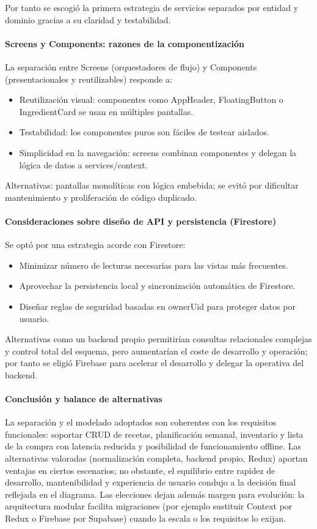 \documentclass[twoside, openright, 11pt]{report}
\begin{document}
		Por tanto se escogió la primera estrategia de servicios separados por entidad y dominio gracias a su claridad y testabilidad.
		
		\paragraph{Screens y Components: razones de la componentización}
		La separación entre Screens (orquestadores de flujo) y Components (presentacionales y reutilizables) responde a:
		\begin{itemize}
			\item Reutilización visual: componentes como AppHeader, FloatingButton o IngredientCard se usan en múltiples pantallas.
			\item Testabilidad: los componentes puros son fáciles de testear aislados.
			\item Simplicidad en la navegación: screens combinan componentes y delegan la lógica de datos a services/context.
		\end{itemize}
		Alternativas: pantallas monolíticas con lógica embebida; se evitó por dificultar mantenimiento y proliferación de código duplicado.
		
		\paragraph{Consideraciones sobre diseño de API y persistencia (Firestore)}
		Se optó por una estrategia acorde con Firestore:
		\begin{itemize}
			\item Minimizar número de lecturas necesarias para las vistas más frecuentes.
			\item Aprovechar la persistencia local y sincronización automática de Firestore.
			\item Diseñar reglas de seguridad basadas en ownerUid para proteger datos por usuario.
		\end{itemize}
		Alternativas como un backend propio permitirían consultas relacionales complejas y control total del esquema, pero aumentarían el coste de desarrollo y operación; por tanto se eligió Firebase para acelerar el desarrollo y delegar la operativa del backend.
		
		\paragraph{Conclusión y balance de alternativas}
		La separación y el modelado adoptados son coherentes con los requisitos funcionales: soportar CRUD de recetas, planificación semanal, inventario y lista de la compra con latencia reducida y posibilidad de funcionamiento offline. Las alternativas valoradas (normalización completa, backend propio, Redux) aportan ventajas en ciertos escenarios; no obstante, el equilibrio entre rapidez de desarrollo, mantenibilidad y experiencia de usuario condujo a la decisión final reflejada en el diagrama. Las elecciones dejan además margen para evolución: la arquitectura modular facilita migraciones (por ejemplo sustituir Context por Redux o Firebase por Supabase) cuando la escala o los requisitos lo exijan.
		
\end{document}
